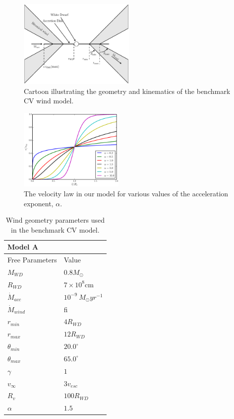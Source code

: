 \documentclass[preprint, a4paper, 11pt]{aastex}
\begin{document}
\begin{figure}
\centering
\includegraphics[width=0.5\textwidth]{figures/fig2_cartoon.eps}
\caption{Cartoon illustrating the geometry and kinematics of the benchmark CV wind model.}
\label{cartoon}
\end{figure}


\begin{figure}
\centering
\includegraphics[width=0.45\textwidth]{figures/acc_law.eps}
\caption{
The velocity law in our model for various values of
the acceleration exponent, $\alpha$.
}
\label{acc_law}
\end{figure}


\begin{table}
\centering
\begin{tabular}{p{3cm}p{4cm}}
Model A \\
\hline Free Parameters 	&	 Value \\ 
\hline \hline 
$M_{WD}$ 	 &	 $0.8 M_{\odot}$ \\ 
$R_{WD}$ 	 &	 $7\times10^{8}$cm\\ 
$\dot{M}_{acc}$ 	 &	 $10^{-9}~M_{\odot}yr^{-1}$\\ 
$\dot{M}_{wind}$  &	fi\\ 
$r_{min}$ 	&	 $4 R_{WD}$\\ 
$r_{max}$ 	&	 $12 R_{WD}$ \\ 
$\theta_{min}$ 	&	 $20.0^{\circ}$ \\ 
$\theta_{max}$ 	&	 $65.0^{\circ}$ \\ 
$\gamma$ 	&	 $1$ \\ 
$v_{\infty}$ 	&	 $3v_{esc}$ \\ 
$R_v$ 	        &	 $100 R_{WD}$ \\ 
$\alpha$ 	&	 $1.5$ \\
\end{tabular}
\centering
\caption{
Wind geometry parameters used in the benchmark CV model.}
\label{wind_param}
\end{table}
\end{document}
